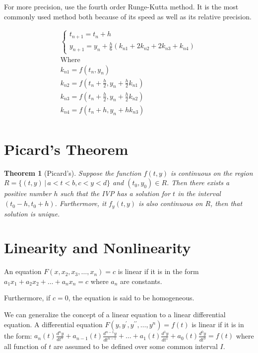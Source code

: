 \documentclass[12pt,landscape,twocolumn]{article}
\newtheorem{thm}{Theorem}
\begin{document}
    For more precision, use the fourth order Runge-Kutta method. It is the most commonly used method both because of its speed as well as its relative precision.

    \begin{equation}\label{eq:4ork}
    \begin{aligned}
    \begin{cases}
    t_{n+1} = t_n + h\\
    y_{n+1} = y_n + \frac{h}{6} \left( k_{n1} + 2 k_{n2} + 2 k_{n3} + k_{n4} \right)
    \end{cases}\\
    \text{Where}\\
    k_{n1} = f(t_n, y_n)\\
    k_{n2} = f \left( t_n + \frac{h}{2}, y_n + \frac{h}{2} k_{n1} \right)\\
    k_{n3} = f \left( t_n + \frac{h}{2}, y_n + \frac{h}{2} k_{n2} \right)\\
    k_{n4} = f \left( t_n + h, y_n + h k_{n3} \right)\\
    \end{aligned}
    \end{equation}

\section{Picard's Theorem}\label{sec:picardstheorem}

    \begin{thm}[Picard's]
        Suppose the function $f(t, y)$ is continuous on the region $R=\{ (t,y) \, | \, a < t < b, c < y < d \}$ and $(t_0, y_0) \in R$. Then there exists a positive number $h$ such that the IVP has a solution for $t$ in the interval $(t_0 - h, t_0 + h)$. Furthermore, it $f_y(t,y)$ is also continuous on $R$, then that solution is unique.
    \end{thm}

\section{Linearity and Nonlinearity}
An equation $F(x, x_2, x_3, \dots, x_n) = c$ is linear if it is in the form $a_1x_1 + a_2x_2 + \dots + a_nx_n = c$ where $a_n$ are constants.

Furthermore, if $c=0$, the equation is said to be homogeneous.

We can generalize the concept of a linear equation to a linear differential equation. A differential equation $F(y, y^\prime, y^{\prime\prime}, \dots, y^n) = f(t)$ is linear if it is in the form:
$
a_n(t) \frac{d^ny}{dt^n} + a_{n-1}(t) \frac{d^{n-1}y}{dt^{n-1} } + \dots + a_1(t) \frac{d^1y}{dt^1} + a_0(t) \frac{d^0y}{dt^0} = f(t)
$
where all function of $t$ are assumed to be defined over some common interval $I$.
\end{document}
